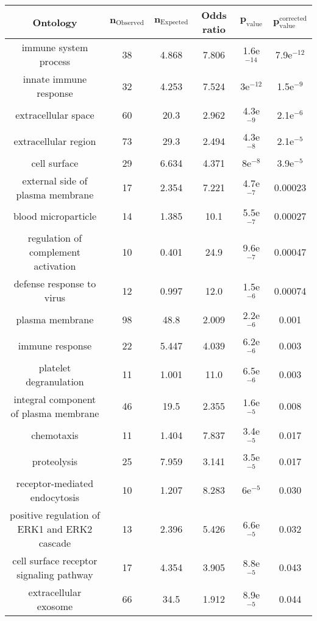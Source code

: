 \documentclass{article}
\begin{document}
\begin{table*}[h!]
	\centering
	\begin{adjustbox}{width = 1\textwidth}
		\small
		\begin{tabular}{|c|c|c|c|c|c|}
			\hline
			\textbf{Ontology} & $\bm{n_{\mathrm{Observed}}}$ & $\bm{n_{\mathrm{Expected}}}$ & \textbf{Odds ratio} & $\bm{p_{\mathrm{value}}}$ & $\bm{p_{\mathrm{value}}^{\mathrm{corrected}}}$		\\
			\hline
			immune system process & 38 & 4.868 & 7.806 & 1.6e$^{-14}$ & 7.9e$^{-12}$ \\
			innate immune response & 32 & 4.253 & 7.524 & 3e$^{-12}$ & 1.5e$^{-9}$ \\
			extracellular space & 60 & 20.3 & 2.962 & 4.3e$^{-9}$ & 2.1e$^{-6}$ \\
			extracellular region & 73 & 29.3 & 2.494 & 4.3e$^{-8}$ & 2.1e$^{-5}$ \\
			cell surface & 29 & 6.634 & 4.371 & 8e$^{-8}$ & 3.9e$^{-5}$ \\
			external side of plasma membrane & 17 & 2.354 & 7.221 & 4.7e$^{-7}$ & 0.00023 \\
			blood microparticle & 14 & 1.385 & 10.1 & 5.5e$^{-7}$ & 0.00027 \\
			regulation of complement activation & 10 & 0.401 & 24.9 & 9.6e$^{-7}$ & 0.00047 \\
			defense response to virus & 12 & 0.997 & 12.0 & 1.5e$^{-6}$ & 0.00074 \\
			plasma membrane & 98 & 48.8 & 2.009 & 2.2e$^{-6}$ & 0.001 \\
			immune response & 22 & 5.447 & 4.039 & 6.2e$^{-6}$ & 0.003 \\
			platelet degranulation & 11 & 1.001 & 11.0 & 6.5e$^{-6}$ & 0.003 \\
			integral component of plasma membrane & 46 & 19.5 & 2.355 & 1.6e$^{-5}$ & 0.008 \\
			chemotaxis & 11 & 1.404 & 7.837 & 3.4e$^{-5}$ & 0.017 \\
			proteolysis & 25 & 7.959 & 3.141 & 3.5e$^{-5}$ & 0.017 \\
			receptor-mediated endocytosis & 10 & 1.207 & 8.283 & 6e$^{-5}$ & 0.030 \\
			positive regulation of ERK1 and ERK2 cascade & 13 & 2.396 & 5.426 & 6.6e$^{-5}$ & 0.032 \\
			cell surface receptor signaling pathway & 17 & 4.354 & 3.905 & 8.8e$^{-5}$ & 0.043 \\
			extracellular exosome & 66 & 34.5 & 1.912 & 8.9e$^{-5}$ & 0.044 \\

\end{tabular}
\end{adjustbox}
\end{table*}
\end{document}
